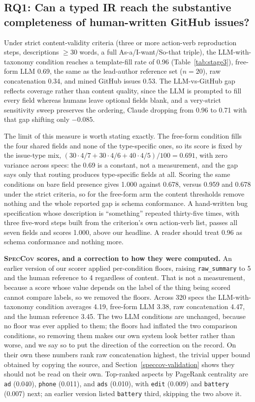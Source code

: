 \documentclass[preprint,12pt]{elsarticle}
\begin{document}
\subsection{RQ1: Can a typed IR reach the substantive completeness of human-written GitHub issues?}\label{exp1-results}

Under strict content-validity criteria (three or more action-verb reproduction steps,
descriptions $\geq 30$ words, a full As-a/I-want/So-that triple), the LLM-with-taxonomy condition
reaches a template-fill rate of 0.96 (Table~\ref{tab:stage3}), free-form LLM 0.69, the same as the
lead-author reference set ($n=20$), raw concatenation 0.34, and mined GitHub issues 0.53. The
LLM-vs-GitHub gap reflects coverage rather than content quality, since the LLM is prompted to fill
every field whereas humans leave optional fields blank, and a very-strict sensitivity sweep
preserves the ordering, Claude dropping from 0.96 to 0.71 with that gap shifting only $-0.085$.

The limit of this measure is worth stating exactly. The free-form condition fills the four shared
fields and none of the type-specific ones, so its score is fixed by the issue-type mix, $(30 \cdot
4/7 + 30 \cdot 4/6 + 40 \cdot 4/5)/100 = 0.691$, with zero variance across specs: the 0.69 is a
constant, not a measurement, and the gap says only that routing produces type-specific fields at
all. Scoring the same conditions on bare field presence gives 1.000 against 0.678, versus 0.959
and 0.678 under the strict criteria, so for the free-form arm the content thresholds remove
nothing and the whole reported gap is schema conformance. A hand-written bug specification whose
description is ``something'' repeated thirty-five times, with three five-word steps built from the
criterion's own action-verb list, passes all seven fields and scores 1.000, above our headline. A
reader should treat 0.96 as schema conformance and nothing more.

\textbf{\textsc{SpecCov} scores, and a correction to how they were computed.} An earlier
version of our scorer applied per-condition floors, raising \texttt{raw\_summary} to 5 and the
human reference to 4 regardless of content. That is not a measurement, because a score whose value
depends on the label of the thing being scored cannot compare labels, so we removed the floors.
Across 320 specs the LLM-with-taxonomy condition averages 4.19, free-form LLM 3.38, raw
concatenation 4.47, and the human reference 3.45. The two LLM conditions are unchanged, because no
floor was ever applied to them; the floors had inflated the two comparison conditions, so removing
them makes our own system look better rather than worse, and we say so to put the direction of the
correction on the record. On their own these numbers rank raw concatenation highest, the trivial
upper bound obtained by copying the source, and Section~\ref{speccov-validation} shows they should
not be read on their own. Top-ranked aspects by PageRank centrality are \texttt{ad} (0.040),
\texttt{phone} (0.011), and \texttt{ads} (0.010), with \texttt{edit} (0.009) and \texttt{battery}
(0.007) next; an earlier version listed \texttt{battery} third, skipping the two above it.
\end{document}
